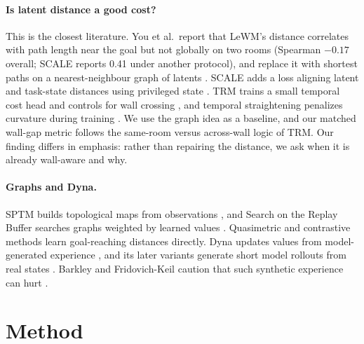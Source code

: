 \documentclass[10pt,twocolumn]{article}
\begin{document}
\paragraph{Is latent distance a good cost?} This is the closest literature. You et al.\ report that LeWM's distance correlates with path length near the goal but not globally on two rooms (Spearman $-0.17$ overall; SCALE reports 0.41 under another protocol), and replace it with shortest paths on a nearest-neighbour graph of latents \cite{you2026ngc}. SCALE adds a loss aligning latent and task-state distances using privileged state \cite{hu2026scale}. TRM trains a small temporal cost head and controls for wall crossing \cite{li2026trm}, and temporal straightening penalizes curvature during training \cite{wang2026straightening}. We use the graph idea as a baseline, and our matched wall-gap metric follows the same-room versus across-wall logic of TRM. Our finding differs in emphasis: rather than repairing the distance, we ask when it is already wall-aware and why.

\paragraph{Graphs and Dyna.} SPTM builds topological maps from observations \cite{savinov2018sptm}, and Search on the Replay Buffer searches graphs weighted by learned values \cite{eysenbach2019sorb}. Quasimetric \cite{wang2023qrl} and contrastive \cite{eysenbach2022contrastive} methods learn goal-reaching distances directly. Dyna updates values from model-generated experience \cite{sutton1990dyna,sutton2018rl}, and its later variants generate short model rollouts from real states \cite{janner2019mbpo}. Barkley and Fridovich-Keil caution that such synthetic experience can hurt \cite{barkley2025stealing}.

\section{Method}
\end{document}
